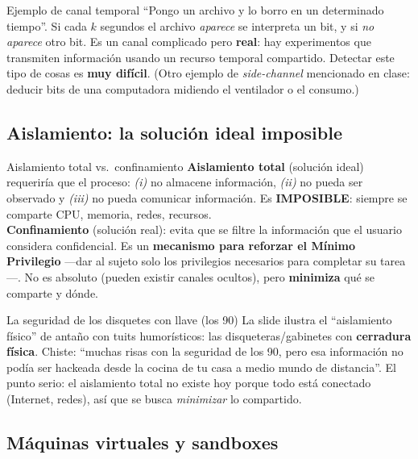 \documentclass[11pt,a4paper]{article}
\begin{document}
\begin{practbox}{Ejemplo de canal temporal}
``Pongo un archivo y lo borro en un determinado tiempo''. Si cada $k$ segundos el archivo
\emph{aparece} se interpreta un bit, y si \emph{no aparece} otro bit. Es un canal complicado
pero \textbf{real}: hay experimentos que transmiten información usando un recurso temporal
compartido. Detectar este tipo de cosas es \textbf{muy difícil}. (Otro ejemplo de
\emph{side-channel} mencionado en clase: deducir bits de una computadora midiendo el ventilador
o el consumo.)
\end{practbox}

\subsection{Aislamiento: la solución ideal imposible}

\begin{defbox}{Aislamiento total vs.\ confinamiento}
\textbf{Aislamiento total} (solución ideal) requeriría que el proceso:
\emph{(i)} no almacene información, \emph{(ii)} no pueda ser observado y \emph{(iii)} no pueda
comunicar información. Es \textbf{IMPOSIBLE}: siempre se comparte CPU, memoria, redes,
recursos.\\[4pt]
\textbf{Confinamiento} (solución real): evita que se filtre la información que el usuario
considera confidencial. Es un \textbf{mecanismo para reforzar el Mínimo Privilegio} —dar al
sujeto solo los privilegios necesarios para completar su tarea—. No es absoluto (pueden
existir canales ocultos), pero \textbf{minimiza} qué se comparte y dónde.
\end{defbox}

\begin{practbox}{La seguridad de los disquetes con llave (los 90)}
La slide ilustra el ``aislamiento físico'' de antaño con tuits humorísticos: las
disqueteras/gabinetes con \textbf{cerradura física}. Chiste: ``muchas risas con la seguridad de
los 90, pero esa información no podía ser hackeada desde la cocina de tu casa a medio mundo de
distancia''. El punto serio: el aislamiento total no existe hoy porque todo está conectado
(Internet, redes), así que se busca \emph{minimizar} lo compartido.
\end{practbox}

\subsection{Máquinas virtuales y sandboxes}
\end{document}
